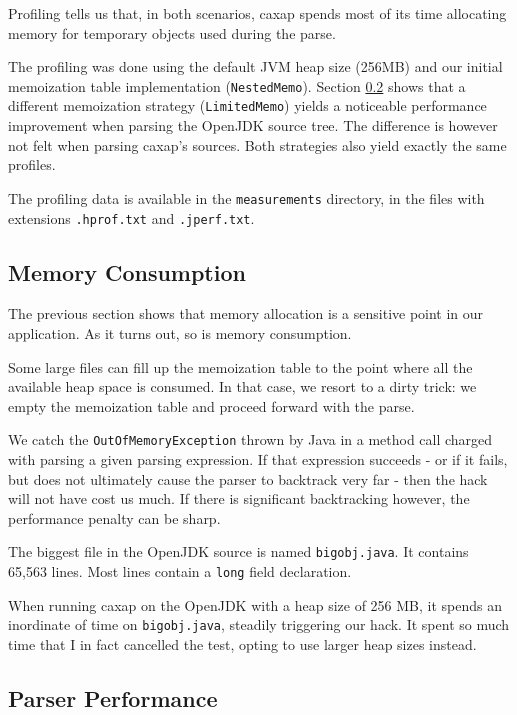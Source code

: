 Profiling tells us that, in both scenarios, caxap spends most of its time
allocating memory for temporary objects used during the parse.

The profiling was done using the default JVM heap size (256MB) and our initial
memoization table implementation (\texttt{NestedMemo}). Section
\ref{implem_perf} shows that a different memoization strategy
(\texttt{LimitedMemo}) yields a noticeable performance improvement when parsing
the OpenJDK source tree. The difference is however not felt when parsing caxap's
sources. Both strategies also yield exactly the same profiles.

The profiling data is available in the \texttt{measurements} directory, in the
files with extensions \texttt{.hprof.txt} and \texttt{.jperf.txt}.

\subsection{Memory Consumption}
\label{hack}

The previous section shows that memory allocation is a sensitive point in our
application. As it turns out, so is memory consumption.

Some large files can fill up the memoization table to the point where all the
available heap space is consumed. In that case, we resort to a dirty trick: we
empty the memoization table and proceed forward with the parse.

We catch the \texttt{OutOfMemoryException} thrown by Java in a method call
charged with parsing a given parsing expression. If that expression succeeds -
or if it fails, but does not ultimately cause the parser to backtrack very far -
then the hack will not have cost us much. If there is significant backtracking
however, the performance penalty can be sharp.

The biggest file in the OpenJDK source is named \texttt{bigobj.java}. It
contains 65,563 lines. Most lines contain a \texttt{long} field declaration.

When running caxap on the OpenJDK with a heap size of 256 MB, it spends an
inordinate of time on \texttt{bigobj.java}, steadily triggering our hack. It
spent so much time that I in fact cancelled the test, opting to use larger heap
sizes instead.

\subsection{Parser Performance}
\label{implem_perf}

